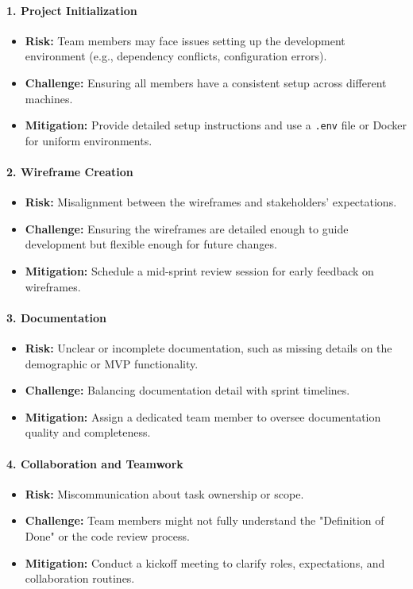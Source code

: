 \documentclass{article}
\begin{document}
\paragraph{1. Project Initialization}
\begin{itemize}
    \item \textbf{Risk:} Team members may face issues setting up the development environment (e.g., dependency conflicts, configuration errors).
    \item \textbf{Challenge:} Ensuring all members have a consistent setup across different machines.
    \item \textbf{Mitigation:} Provide detailed setup instructions and use a \verb|.env| file or Docker for uniform environments.
\end{itemize}

\paragraph{2. Wireframe Creation}
\begin{itemize}
    \item \textbf{Risk:} Misalignment between the wireframes and stakeholders' expectations.
    \item \textbf{Challenge:} Ensuring the wireframes are detailed enough to guide development but flexible enough for future changes.
    \item \textbf{Mitigation:} Schedule a mid-sprint review session for early feedback on wireframes.
\end{itemize}

\paragraph{3. Documentation}
\begin{itemize}
    \item \textbf{Risk:} Unclear or incomplete documentation, such as missing details on the demographic or MVP functionality.
    \item \textbf{Challenge:} Balancing documentation detail with sprint timelines.
    \item \textbf{Mitigation:} Assign a dedicated team member to oversee documentation quality and completeness.
\end{itemize}

\paragraph{4. Collaboration and Teamwork}
\begin{itemize}
    \item \textbf{Risk:} Miscommunication about task ownership or scope.
    \item \textbf{Challenge:} Team members might not fully understand the "Definition of Done" or the code review process.
    \item \textbf{Mitigation:} Conduct a kickoff meeting to clarify roles, expectations, and collaboration routines.
\end{itemize}
\end{document}
